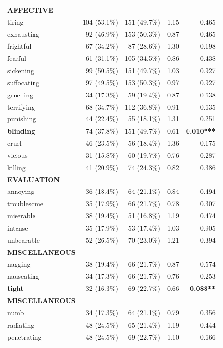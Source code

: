 \documentclass[preprint,12pt,authoryear]{elsarticle}
\begin{document}
\begin{table}[t!]
\begin{minipage}{0.49\textwidth}
{\begin{tabular}{lrrrr}
\midrule
\textbf{AFFECTIVE} & & & & \\
tiring & 104 (53.1\%) & 151 (49.7\%) & 1.15 & 0.465 \\
exhausting & 92 (46.9\%) & 153 (50.3\%) & 0.87 & 0.465 \\
frightful & 67 (34.2\%) & 87 (28.6\%) & 1.30 & 0.198 \\
fearful & 61 (31.1\%) & 105 (34.5\%) & 0.86 & 0.438 \\
sickening & 99 (50.5\%) & 151 (49.7\%) & 1.03 & 0.927 \\
suffocating & 97 (49.5\%) & 153 (50.3\%) & 0.97 & 0.927 \\
gruelling & 34 (17.3\%) & 59 (19.4\%) & 0.87 & 0.638 \\
terrifying & 68 (34.7\%) & 112 (36.8\%) & 0.91 & 0.635 \\
punishing & 44 (22.4\%) & 55 (18.1\%) & 1.31 & 0.251 \\
\textbf{blinding} & 74 (37.8\%) & 151 (49.7\%) & 0.61 & \textbf{0.010***} \\
cruel & 46 (23.5\%) & 56 (18.4\%) & 1.36 & 0.175 \\
vicious & 31 (15.8\%) & 60 (19.7\%) & 0.76 & 0.287 \\
killing & 41 (20.9\%) & 74 (24.3\%) & 0.82 & 0.386 \\
\midrule
\textbf{EVALUATION} & & & & \\
annoying & 36 (18.4\%) & 64 (21.1\%) & 0.84 & 0.494 \\
troublesome & 35 (17.9\%) & 66 (21.7\%) & 0.78 & 0.307 \\
miserable & 38 (19.4\%) & 51 (16.8\%) & 1.19 & 0.474 \\
intense & 35 (17.9\%) & 53 (17.4\%) & 1.03 & 0.905 \\
unbearable & 52 (26.5\%) & 70 (23.0\%) & 1.21 & 0.394 \\
\midrule
\textbf{MISCELLANEOUS} & & & & \\
nagging & 38 (19.4\%) & 66 (21.7\%) & 0.87 & 0.574 \\
nauseating & 34 (17.3\%) & 66 (21.7\%) & 0.76 & 0.253 \\
\textbf{tight} & 32 (16.3\%) & 69 (22.7\%) & 0.66 & \textbf{0.088**} \\
\textbf{MISCELLANEOUS} & & & & \\
numb & 34 (17.3\%) & 64 (21.1\%) & 0.79 & 0.356 \\
radiating & 48 (24.5\%) & 65 (21.4\%) & 1.19 & 0.444 \\
penetrating & 48 (24.5\%) & 69 (22.7\%) & 1.10 & 0.666 \\

\end{tabular}}
\end{minipage}
\end{table}
\end{document}
